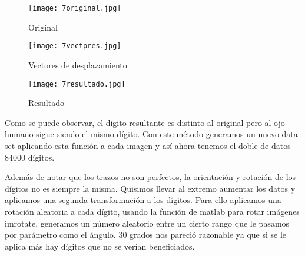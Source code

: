 \begin{algorithm}[H]
\NoCaptionOfAlgo
\end{algorithm}

\begin{figure}[!htb]
  \texttt{[image: 7original.jpg]}
  \caption{Original}
\endminipage\hfill
{}
  \texttt{[image: 7vectpres.jpg]}
  \caption{Vectores de desplazamiento}
\endminipage\hfill
{}%
  \texttt{[image: 7resultado.jpg]}
  \caption{Resultado}
\endminipage
\end{figure}


Como se puede observar, el dígito resultante es distinto al original pero al ojo humano sigue siendo el mismo dígito. Con este método generamos un nuevo data-set aplicando esta función a cada imagen y así ahora tenemos el doble de datos 84000 dígitos. 

Además de notar que los trazos no son perfectos, la orientación y rotación de los dígitos no es siempre la misma. Quisimos llevar al extremo aumentar los datos y aplicamos una segunda transformación a los dígitos. Para ello aplicamos una rotación aleatoria a cada dígito, usando la función de matlab para rotar imágenes imrotate, generamos un número aleatorio entre un cierto rango que le pasamos por parámetro como el ángulo. 30 grados nos pareció razonable ya que si se le aplica más hay dígitos que no se verían beneficiados.

